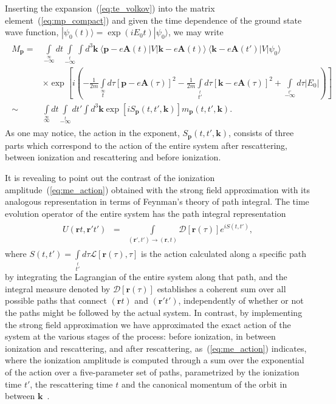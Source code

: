 Inserting the expansion~(\ref{eq:te_volkov}) into the matrix
element~(\ref{eq:mp_compact}) and given the time dependence of the
ground state wave function,
$|\psi_{0}(t) \rangle = \exp{(iE_{0}t)} | \psi_{0} \rangle$, we may
write
\begin{eqnarray}
\label{eq:me_action}
\begin{split}
M_{\mathbf{p}} = & \int\limits_{-\infty}\limits^{\infty} dt
\int\limits_{-\infty}\limits^{t} \int d^{3}\mathbf{k}
\ \langle \mathbf{p} - e\mathbf{A}(t) | V | \mathbf{k} - e\mathbf{A}(t) \rangle
\ \langle \mathbf{k} - e\mathbf{A}(t') | V | \psi_{0} \rangle \\
&
\times
\exp \left[i\left(-\frac{1}{2m} \int\limits_{t}\limits^{\infty}
d\tau [\mathbf{p} -e\mathbf{A}(\tau)]^{2} -
\frac{1}{2m} \int\limits_{t'}\limits^{t} d\tau [\mathbf{k} -e\mathbf{A}(\tau)]^{2} +
\int\limits_{-\infty}\limits^{t'} d\tau |E_{0}|
\right)
\right] \\
\sim &
\int\limits_{\infty}\limits^{\infty} dt
\int\limits_{-\infty}\limits^{t} dt'
\int d^{3}\mathbf{k} \exp \left[ iS_{\mathbf{p}}(t, t', \mathbf{k}) \right]
m_{\mathbf{p}}(t, t', \mathbf{k}).
\end{split}
\end{eqnarray}
As one may notice, the action in the exponent,
$S_{\mathbf{p}}(t, t', \mathbf{k})$, consists of three parts which
correspond to the action of the entire system after rescattering,
between ionization and rescattering and before ionization.

It is revealing to point out the contrast of the ionization
amplitude~(\ref{eq:me_action}) obtained with the strong field
approximation with its analogous representation in terms of Feynman's
theory of path integral. The time evolution operator of the entire
system has the path integral representation
\begin{eqnarray}
\label{eq:te_path}
\begin{split}
U(\mathbf{r}t, \mathbf{r}'t') & = &
\int\limits_{(\mathbf{r}',t')\to(\mathbf{r},t)}
\mathcal{D}\left[ \mathbf{r}(\tau) \right] e^{i S(t, t')},
\end{split}
\end{eqnarray}
where
$S(t, t') = \int\limits_{t'}\limits^{t} d\tau
\mathcal{L}[\mathbf{r}(\tau), \tau]$
is the action calculated along a specific path by integrating the
Lagrangian of the entire system along that path, and the integral
measure denoted by $\mathcal{D}\left[ \mathbf{r}(\tau) \right]$
establishes a coherent sum over all possible paths that connect
$(\mathbf{r}t)$ and $(\mathbf{r}'t')$, independently of whether or not
the paths might be followed by the actual system. In contrast, by
implementing the strong field approximation we have approximated the
exact action of the system at the various stages of the process:
before ionization, in between ionization and rescattering, and after
rescattering, as~(\ref{eq:me_action}) indicates, where the ionization
amplitude is computed through a sum over the exponential of the action
over a five-parameter set of paths, parametrized by the ionization
time $t'$, the rescattering time $t$ and the canonical momentum of the
orbit in between $\mathbf{k}$~\cite{KopoldOptComm2000}.

